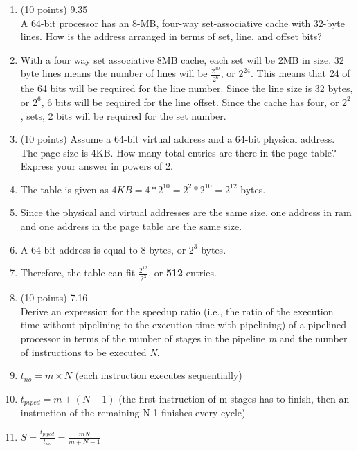 \documentclass[letterpaper,10pt,onecolumn,titlepage]{article}
\begin{document}
\begin{enumerate}
\item (10 points) 9.35 \\
	A 64-bit processor has an 8-MB, four-way set-associative cache with 32-byte lines.
	How is the address arranged in terms of set, line, and offset bits?
\item[\textbullet] With a four way set associative 8MB cache, each set will be 2MB in
	size. 32 byte lines means the number of lines will be $\frac{2^{30}}{2^{6}}$, or
	$2^{24}$. This means that 24 of the 64 bits will be required for the line number.
	Since the line size is 32 bytes, or $2^{6}$, 6 bits will be required for the line
	offset. Since the cache has four, or $2^{2}$, sets, 2 bits will be required for
	the set number.

\item (10 points) Assume a 64-bit virtual address and a 64-bit physical address. The page
	size is 4KB. How many total entries are there in the page table? Express your
	answer in powers of 2.
\item[\textbullet] The table is given as $4KB = 4*2^{10} = 2^{2}*2^{10} = 2^{12}$ bytes.
\item[\textbullet] Since the physical and virtual addresses are the same size, one address
	in ram and one address in the page table are the same size.
\item[\textbullet] A 64-bit address is equal to 8 bytes, or $2^{3}$ bytes.
\item[\textbullet] Therefore, the table can fit $\frac{2^{12}}{2^{3}}$, or \textbf{512}
	entries.

\item (10 points) 7.16  \\
	Derive an expression for the speedup ratio (i.e., the ratio of the execution time
	without pipelining to the execution time with pipelining) of a pipelined processor
	in terms of the number of stages in the pipeline \textit{m} and the number of
	instructions to be executed \textit{N}.
\item[\textbullet] $t_{no} = m \times N$ (each instruction executes sequentially)
\item[\textbullet] $t_{piped} = m + (N - 1)$ (the first instruction of m stages has to 
	finish, then an instruction of the remaining N-1 finishes every cycle)
\item[\textbullet] $S = \frac{t_{piped}}{t_{no}} = \frac{mN}{m+N-1}$


\end{enumerate}
\end{document}
